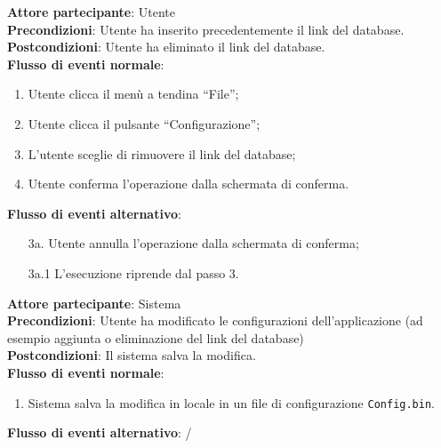 \begin{tcolorbox}[colback=white,colframe=black!80!white,title=\textbf{C13 - Eliminare configurazione database}]
	\textbf{Attore partecipante}: Utente
	\\\textbf{Precondizioni}: Utente ha inserito precedentemente il link del database.
	\\\textbf{Postcondizioni}: Utente ha eliminato il link del database.
	\\\textbf{Flusso di eventi normale}:
	\begin{enumerate}[noitemsep, topsep=0pt]
		\item Utente clicca il menù a tendina “File”;
		\item Utente clicca il pulsante “Configurazione”;
		\item L’utente sceglie di rimuovere il link del database;
		\item Utente conferma l’operazione dalla schermata di conferma.
	\end{enumerate}
	\textbf{Flusso di eventi alternativo}:
	\begin{itemize}[noitemsep, topsep=0pt]
		\item[3a. ] Utente annulla l’operazione dalla schermata di conferma;
		\item[3a.1]	L’esecuzione riprende dal passo 3.
	\end{itemize}
\end{tcolorbox}

\begin{tcolorbox}[colback=white,colframe=black!80!white,title=\textbf{C14 - Salvare configurazione}]
	\textbf{Attore partecipante}: Sistema
	\\\textbf{Precondizioni}: Utente ha modificato le configurazioni dell’applicazione (ad esempio aggiunta o eliminazione del link del database)
	\\\textbf{Postcondizioni}: Il sistema salva la modifica.
	\\\textbf{Flusso di eventi normale}:
	\begin{enumerate}[noitemsep, topsep=0pt]
		\item Sistema salva la modifica in locale in un file di configurazione \texttt{Config.bin}.
	\end{enumerate}
	\textbf{Flusso di eventi alternativo}: /
\end{tcolorbox}
